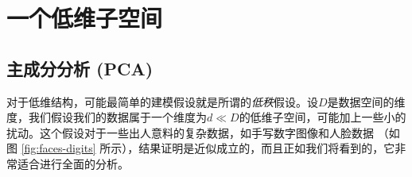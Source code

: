 \documentclass[../../book-main.tex]{subfiles}
\begin{document}








\section{一个低维子空间} \label{sec:lowrank}

\subsection{主成分分析 (PCA)} \label{sub:pca}

对于低维结构，可能最简单的建模假设就是所谓的\textit{低秩}假设。设\(D\)是数据空间的维度，我们假设我们的数据属于一个维度为\(d \ll D\)的低维子空间，可能加上一些小的扰动。这个假设对于一些出人意料的复杂数据，如手写数字图像和人脸数据 \cite{BasriR2003-PAMI}（如图 \ref{fig:faces-digits} 所示），结果证明是近似成立的，而且正如我们将看到的，它非常适合进行全面的分析。
\end{document}
